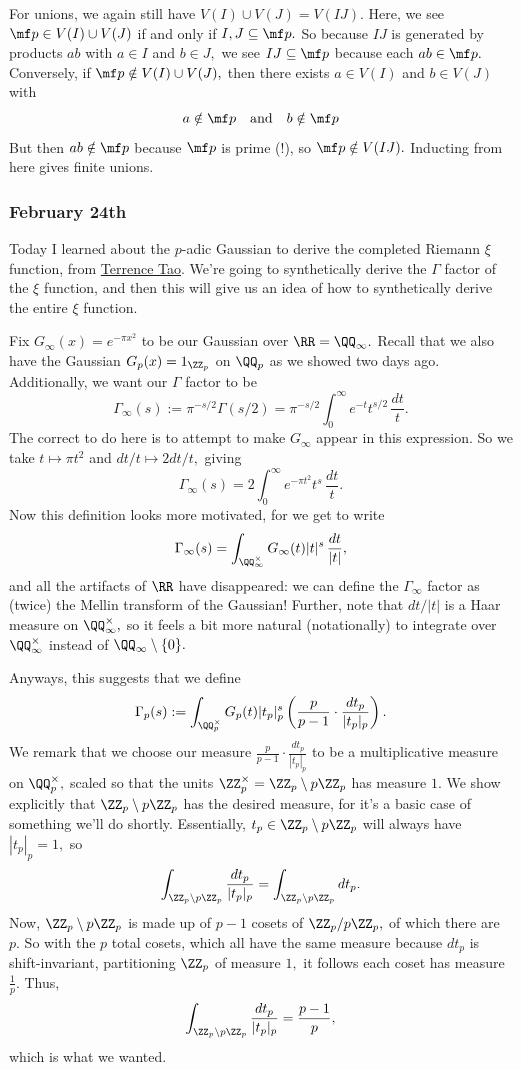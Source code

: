 For unions, we again still have $V(I)\cup V(J)=V(IJ).$ Here, we see $\mf p\in V(I)\cup V(J)$ if and only if $I,J\subseteq\mf p.$ So because $IJ$ is generated by products $ab$ with $a\in I$ and $b\in J,$ we see $IJ\subseteq\mf p$ because each $ab\in\mf p.$ Conversely, if $\mf p\notin V(I)\cup V(J),$ then there exists $a\in V(I)$ and $b\in V(J)$ with
\[a\notin\mf p\quad\text{and}\quad b\notin\mf p\]
But then $ab\notin\mf p$ because $\mf p$ is prime (!), so $\mf p\notin V(IJ).$ Inducting from here gives finite unions.

\subsubsection{February 24th}
Today I learned about the $p$-adic Gaussian to derive the completed Riemann $\xi$ function, from \href{https://terrytao.wordpress.com/2008/07/27/tates-proof-of-the-functional-equation/}{Terrence Tao}. We're going to synthetically derive the $\Gamma$ factor of the $\xi$ function, and then this will give us an idea of how to synthetically derive the entire $\xi$ function.

Fix $G_\infty(x)=e^{-\pi x^2}$ to be our Gaussian over $\RR=\QQ_\infty.$ Recall that we also have the Gaussian $G_p(x)=1_{\ZZ_p}$ on $\QQ_p$ as we showed two days ago. Additionally, we want our $\Gamma$ factor to be
\[\Gamma_\infty(s):=\pi^{-s/2}\Gamma(s/2)=\pi^{-s/2}\int_0^\infty e^{-t}t^{s/2}\,\frac{dt}t.\]
The correct to do here is to attempt to make $G_\infty$ appear in this expression. So we take $t\mapsto\pi t^2$ and $dt/t\mapsto 2dt/t,$ giving
\[\Gamma_\infty(s)=2\int_0^\infty e^{-\pi t^2}t^s\,\frac{dt}t.\]
Now this definition looks more motivated, for we get to write
\[\Gamma_\infty(s)=\int_{\QQ_\infty^\times}G_\infty(t)|t|^s\,\frac{dt}{|t|},\]
and all the artifacts of $\RR$ have disappeared: we can define the $\Gamma_\infty$ factor as (twice) the Mellin transform of the Gaussian! Further, note that $dt/|t|$ is a Haar measure on $\QQ_\infty^\times,$ so it feels a bit more natural (notationally) to integrate over $\QQ_\infty^\times$ instead of $\QQ_\infty\setminus\{0\}.$

Anyways, this suggests that we define
\[\Gamma_p(s):=\int_{\QQ_p^\times}G_p(t)|t_p|_p^s\left(\frac p{p-1}\cdot\frac{dt_p}{|t_p|_p}\right).\]
We remark that we choose our measure $\frac p{p-1}\cdot\frac{dt_p}{|t_p|_p}$ to be a multiplicative measure on $\QQ_p^\times,$ scaled so that the units $\ZZ_p^\times=\ZZ_p\setminus p\ZZ_p$ has measure $1.$ We show explicitly that $\ZZ_p\setminus p\ZZ_p$ has the desired measure, for it's a basic case of something we'll do shortly. Essentially, $t_p\in\ZZ_p\setminus p\ZZ_p$ will always have $|t_p|_p=1,$ so
\[\int_{\ZZ_p\setminus p\ZZ_p}\frac{dt_p}{|t_p|_p}=\int_{\ZZ_p\setminus p\ZZ_p}dt_p.\]
Now, $\ZZ_p\setminus p\ZZ_p$ is made up of $p-1$ cosets of $\ZZ_p/p\ZZ_p,$ of which there are $p.$ So with the $p$ total cosets, which all have the same measure because $dt_p$ is shift-invariant, partitioning $\ZZ_p$ of measure $1,$ it follows each coset has measure $\frac1p.$ Thus,
\[\int_{\ZZ_p\setminus p\ZZ_p}\frac{dt_p}{|t_p|_p}=\frac{p-1}p,\]
which is what we wanted.

